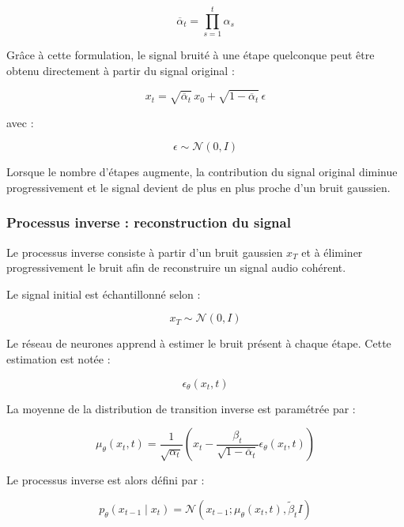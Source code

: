 \begin{equation}
\overline{\alpha}_t =
\prod_{s=1}^{t}\alpha_s
\end{equation}

Grâce à cette formulation, le signal bruité à une étape quelconque
peut être obtenu directement à partir du signal original :

\begin{equation}
x_t =
\sqrt{\overline{\alpha}_t}\,x_0
+
\sqrt{1-\overline{\alpha}_t}\,\epsilon
\end{equation}

avec :

\begin{equation}
\epsilon \sim \mathcal{N}(0,I)
\end{equation}

Lorsque le nombre d'étapes augmente, la contribution du signal
original diminue progressivement et le signal devient de plus
en plus proche d'un bruit gaussien.

\subsubsection{Processus inverse : reconstruction du signal}

Le processus inverse consiste à partir d'un bruit gaussien
$x_T$ et à éliminer progressivement le bruit afin de reconstruire
un signal audio cohérent.

Le signal initial est échantillonné selon :

\begin{equation}
x_T \sim \mathcal{N}(0,I)
\end{equation}

Le réseau de neurones apprend à estimer le bruit présent à
chaque étape. Cette estimation est notée :

\begin{equation}
\epsilon_\theta(x_t,t)
\end{equation}

La moyenne de la distribution de transition inverse est
paramétrée par :

\begin{equation}
\mu_\theta(x_t,t)
=
\frac{1}{\sqrt{\alpha_t}}
\left(
x_t -
\frac{\beta_t}
{\sqrt{1-\overline{\alpha}_t}}
\epsilon_\theta(x_t,t)
\right)
\end{equation}

Le processus inverse est alors défini par :

\begin{equation}
p_\theta(x_{t-1}\mid x_t)
=
\mathcal{N}
\left(
x_{t-1};
\mu_\theta(x_t,t),
\widetilde{\beta}_t I
\right)
\end{equation}

